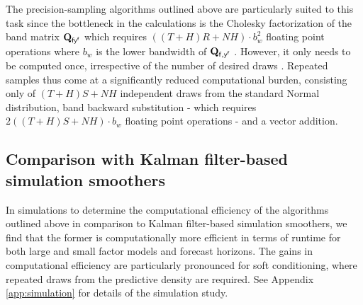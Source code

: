\documentclass[notitlepage,a4paper,12pt]{article}
\begin{document}
The precision-sampling algorithms outlined above are particularly suited to this task since the bottleneck in the calculations is the Cholesky factorization of the band matrix $\mathbf{Q}_{\sf{f} y^{\sf{f}}}$ which requires $((T+H)R+NH)\cdot b_w^2$ floating point operations where $b_w$ is the lower bandwidth of $\mathbf{Q}_{\sf{f}, y^{\sf{f}}}$ \citep[][4.3.5]{GolubvanLoan2013}. However, it only needs to be computed once, irrespective of the number of desired draws \citep{rue2001_jrss}. Repeated samples thus come at a significantly reduced computational burden, consisting only of $(T+H)S+NH$ independent draws from the standard Normal distribution, band backward substitution - which requires $2 ((T+H)S+NH) \cdot b_w$ floating point operations \citep[][4.3.2]{GolubvanLoan2013}- and a vector addition.

\subsection{Comparison with Kalman filter-based simulation smoothers}

In simulations to determine the computational efficiency of the algorithms outlined above in comparison to Kalman filter-based simulation smoothers, we find that the former is computationally more efficient in terms of runtime for both large and small factor models and forecast horizons. The gains in computational efficiency are particularly pronounced for soft conditioning, where repeated draws from the predictive density are required. See Appendix \ref{app:simulation} for details of the simulation study.  


\end{document}
